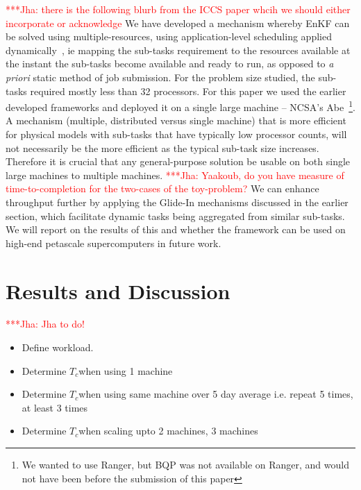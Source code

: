 \documentclass[conference,final]{IEEEtran}
\newcommand{\tc}{$T_c$}
\newcommand{\jhanote}[1]{ {\textcolor{red} { ***Jha: #1 }}}
\begin{document}
\jhanote{there is the following blurb from the ICCS paper whcih we
  should either incorporate or acknowledge} We have developed a
mechanism whereby EnKF can be solved using multiple-resources, using
application-level scheduling applied dynamically~\cite{saga_tg08}, ie
mapping the sub-tasks requirement to the resources available at the
instant the sub-tasks become available and ready to run, as opposed to
{\it a priori} static method of job submission.  For the problem size
studied, the sub-tasks required mostly less than 32 processors. For
this paper we used the earlier developed frameworks and deployed it on
a single large machine -- NCSA's Abe~\footnote{We wanted to use
  Ranger, but BQP was not available on Ranger, and would not have been
  before the submission of this paper}.  A mechanism (multiple,
distributed versus single machine) that is more efficient for physical
models with sub-tasks that have typically low processor counts, will
not necessarily be the more efficient as the typical sub-task size
increases. Therefore it is crucial that any general-purpose solution
be usable on both single large machines to multiple machines.
\jhanote{Yaakoub, do you have measure of time-to-completion for the
  two-cases of the toy-problem?}  We can enhance throughput further by
applying the Glide-In mechanisms discussed in the earlier section,
which facilitate dynamic tasks being aggregated from similar
sub-tasks. We will report on the results of this and whether the
framework can be used on high-end petascale supercomputers in future
work.


\section{Results and Discussion}

\jhanote{Jha to do!}

\begin{itemize}
\item Define workload.
\item Determine  \tc when using 1 machine 
\item Determine \tc when using same machine over 5 day average i.e. repeat 5 times, at least 3 times
\item Determine \tc when scaling upto 2 machines, 3 machines 
\end{itemize}
\end{document}
